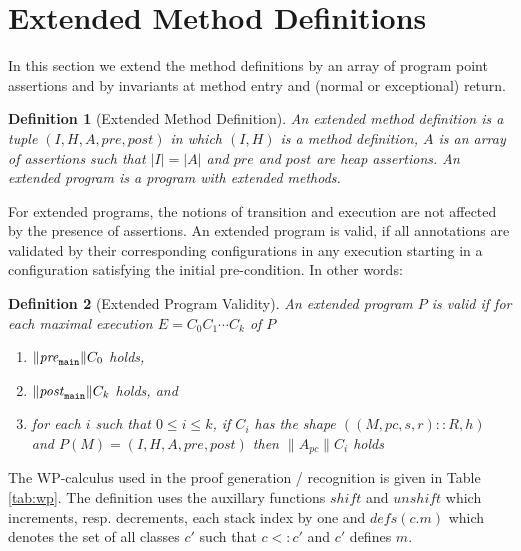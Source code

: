 \documentclass[10pt,twocolumn]{article}
\newtheorem{definition}{Definition}
\newcommand{\Pre}{\mathit{pre}}
\newcommand{\Post}{\mathit{post}}
\newcommand{\DEFS}{\mathit{defs}}
\newcommand{\SHIFT}{\mathit{shift}}
\newcommand{\UNSHIFT}{\mathit{unshift}}
\newcommand{\PC}{\mathit{pc}}
\newcommand{\Sem}[1]{\mbox{$\parallel$}{{#1}}\mbox{$\parallel$}}
\newcommand{\Size}[1]{\mbox{$|$}{#1}\mbox{$|$}}
\begin{document}
\section{Extended Method Definitions}
In this section we extend the method definitions by an array of program point assertions and by invariants at method entry and (normal or exceptional) return.
\begin{definition}[Extended Method Definition]
An {\em extended method definition} is a tuple $(I, H, A, \Pre,\Post)$ in which $(I,H)$ is a method definition, $A$ is an array of assertions such that $\Size{I}=\Size{A}$ and $\Pre$ and $\Post$ are heap assertions. An {\em extended program} is a program with extended methods.
\end{definition}
For extended programs, the notions of transition and 
execution are not affected by the presence of assertions. An extended 
program is valid, if all annotations are validated by their corresponding configurations in any execution starting in a configuration satisfying the initial pre-condition. In other words:
\begin{definition}[Extended Program Validity]
An extended program $P$ is {\em valid} if for each maximal execution $E=C_0 C_1 \cdots C_k$ of $P$
\begin{enumerate}
\item $\Sem{\Pre_{\mbox{\scriptsize\tt main}}}C_0$ holds,
\item $\Sem{\Post_{\mbox{\scriptsize\tt main}}}C_k$ holds, and
\item for each $i$ such that $0\leq i \leq k$, if $C_i$ has the shape $((M,\PC,s,r)::R,h)$ and $P(M) = (I,H,A,\Pre,\Post)$ then $\Sem{A_\PC}C_i$ holds
\end{enumerate}
\end{definition}
The WP-calculus used in the proof generation / recognition is given in Table \ref{tab:wp}.
The definition uses the auxillary functions $\SHIFT$ and $\UNSHIFT$ which 
increments, resp. decrements, each stack index by one and $\DEFS(c.m)$ which 
denotes the set of all classes $c'$ such that $c <: c'$ and $c'$ defines $m$.
\end{document}
